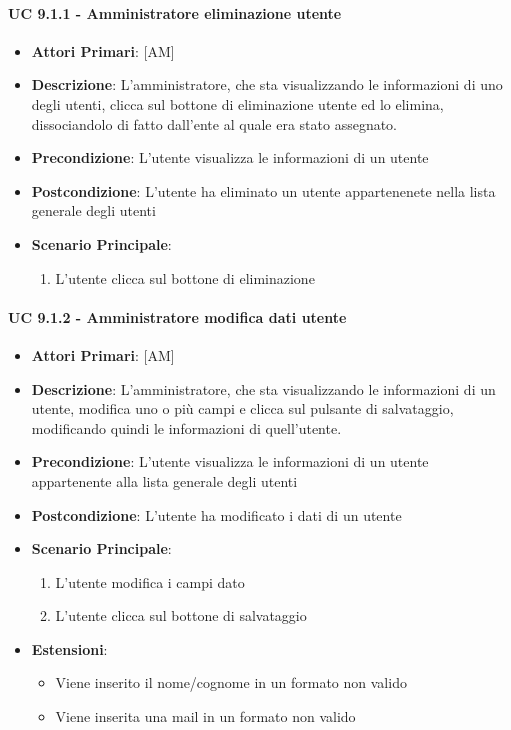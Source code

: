 			\paragraph{UC 9.1.1 - Amministratore eliminazione utente}
			\begin{itemize}
				\item \textbf{Attori Primari}: [AM]
				\item \textbf{Descrizione}: L'amministratore, che sta visualizzando le informazioni di uno degli utenti, clicca sul bottone di eliminazione utente ed lo elimina, dissociandolo di fatto dall'ente al quale era stato assegnato.
				\item \textbf{Precondizione}: L'utente visualizza le informazioni di un utente
				\item \textbf{Postcondizione}: L'utente ha eliminato un utente appartenenete nella lista generale degli utenti 
				\item \textbf{Scenario Principale}:
				\begin{enumerate}
					\item{L'utente clicca sul bottone di eliminazione}
				\end{enumerate}
			\end{itemize}

			\paragraph{UC 9.1.2 - Amministratore modifica dati utente}
			\begin{itemize}
				\item \textbf{Attori Primari}: [AM]
				\item \textbf{Descrizione}: L'amministratore, che sta visualizzando le informazioni di un utente, modifica uno o più campi e clicca sul pulsante di salvataggio, modificando quindi le informazioni di quell'utente.
				\item \textbf{Precondizione}: L'utente visualizza le informazioni di un utente appartenente alla lista generale degli utenti 
				\item \textbf{Postcondizione}: L'utente ha modificato i dati di un utente
				\item \textbf{Scenario Principale}:
				\begin{enumerate}
					\item{L'utente modifica i campi dato}
					\item{L'utente clicca sul bottone di salvataggio}
				\end{enumerate}	
				\item \textbf{Estensioni}:
					\begin{itemize}
						\item Viene inserito il nome/cognome in un formato non valido 
						\item Viene inserita una mail in un formato non valido
					\end{itemize}
			\end{itemize}

